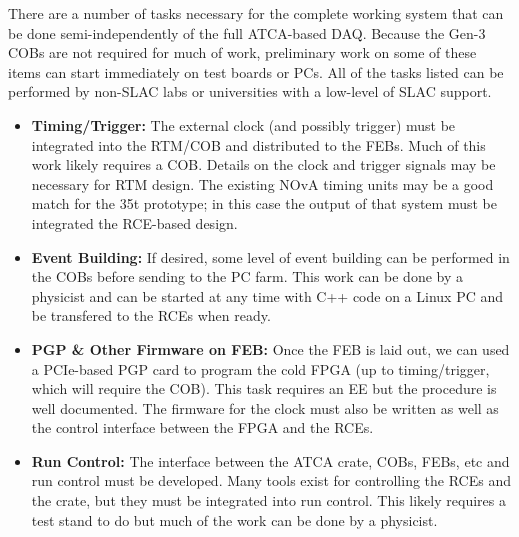 There are a number of tasks necessary for the complete working system that can be done semi-independently of the full ATCA-based DAQ.  
Because the Gen-3 COBs are not required for much 
of work, preliminary work on some of these items can start 
immediately on test boards or PCs.
All of the tasks listed can be performed by non-SLAC labs or universities with a low-level of SLAC support.  
\begin{itemize}
\item \textbf{Timing/Trigger:  }The external clock (and possibly trigger) must be integrated into the RTM/COB and distributed to the FEBs.  Much of this work likely requires a COB.  Details on the clock and trigger signals may be necessary for RTM design.   The existing NOvA timing units may be a good match for the 35t prototype; in this case the output of that system must be integrated the RCE-based design.  
\item \textbf{Event Building:  }If desired, some level of event building can be performed in the COBs before sending to the PC farm.  This work can be done by a physicist and can be started at any time with C++ code on a Linux PC and be transfered to the RCEs when ready.   
\item \textbf{PGP \& Other Firmware on FEB:   } Once the FEB is laid out,  we can used a PCIe-based PGP card to program  the cold FPGA (up to timing/trigger, which will require the COB).  This task requires an EE but the procedure is well documented.  The firmware for the clock must also be written as well as the control interface between the FPGA and the RCEs.  
\item \textbf{Run Control:  }  The interface between the ATCA crate, COBs, FEBs, etc and run control must be developed. Many tools exist for controlling the RCEs and the crate, but they must be integrated into run control.  This likely requires a test stand to do but much of the work can be done by a physicist.  
\end{itemize}


